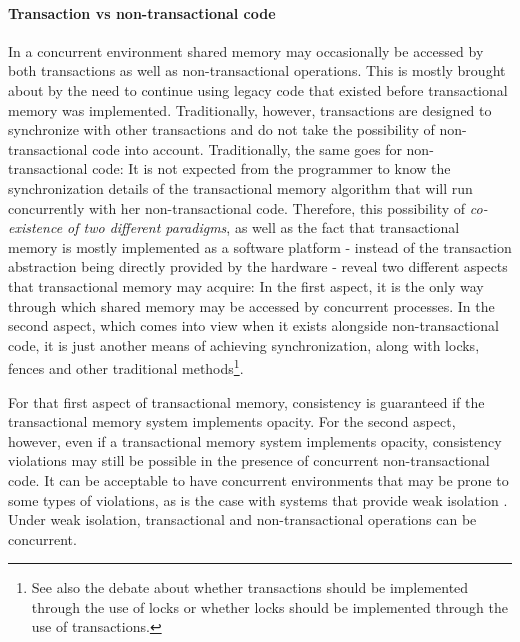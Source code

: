 \documentclass[11pt,letterpaper]{article}
\begin{document}
\paragraph{Transaction vs non-transactional code}
In a  concurrent environment  shared memory  may  occasionally be
accessed by both transactions as well as  
non-transactional operations. This  is mostly brought about by  the need to
continue using legacy code that existed before  
transactional memory was  implemented. Traditionally, however, transactions
are designed to synchronize with other transactions  
and do  not take  the possibility of  non-transactional code  into account.
Traditionally, the same goes for non-transactional code: It  
is not expected from the  programmer to know the synchronization details of
the transactional memory algorithm that will run  
concurrently with  her non-transactional code.  Therefore, this possibility
of {\it co-existence of two different paradigms}, as well as  
the  fact that  transactional memory  is mostly  implemented as  a software
platform - instead of the transaction abstraction being  
directly  provided by  the hardware  -  reveal  two different  aspects that
transactional memory may acquire: In the first aspect,  
it  is  the  only way  through  which  shared  memory  may be  accessed  by
concurrent processes.  In the second aspect, which  
comes into view when it exists alongside non-transactional code, it is just
another means of achieving synchronization,  
along with  locks, fences  and other traditional 
 methods\footnote{See also the debate about whether transactions should be  
implemented through the use of locks or whether locks should be implemented
through the use of transactions.}.  

For that first aspect of transactional memory, consistency is guaranteed if
the transactional memory system implements  
opacity. For the  second aspect, however, even if  a transactional memory
system implements opacity, consistency violations  
may  still be  possible  in the  presence  of concurrent  non-transactional
code. It can be acceptable to have concurrent environments  
that may be prone to some types  of violations, as is the case with systems
that provide weak isolation \cite{blundell06, shpeis07}.  
Under weak isolation, transactional and non-transactional operations can be
concurrent. 
\end{document}
